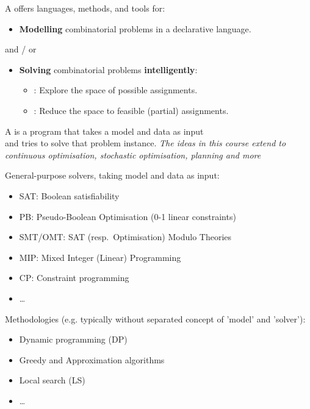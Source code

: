 \documentclass{cons-beamer}
\begin{document}
\begin{frame}
	A  offers languages, methods, and tools for: \vfill
	\begin{itemize}
		\item[what:] \textbf{Modelling} combinatorial problems in a \alert{declarative} language.
	\end{itemize}\vfill
	and / or \vfill
	\begin{itemize}
		\item[how:] \textbf{Solving} combinatorial problems \textbf{intelligently}: \vfill
		\begin{itemize}
			\item {}: Explore the space of possible assignments. \vfill
			\item {}: Reduce the space to feasible (partial) assignments. \vfill
		\end{itemize}
	\end{itemize}
	A  is a program that takes a model and data as input \\
	and tries to solve that problem instance.\vfill
	\textit{The ideas in this course extend to continuous optimisation, stochastic optimisation, planning and more}
\end{frame}

\begin{frame}
	\begin{examples}
		General-purpose solvers, taking model and data as input:
		\begin{itemize}
			\item SAT: Boolean satisfiability
			\item PB: Pseudo-Boolean Optimisation (0-1 linear constraints)
			\item SMT/OMT: SAT (resp.\ Optimisation) Modulo Theories
			\item MIP: Mixed Integer (Linear) Programming
			\item CP: Constraint programming
			\item \dots
		\end{itemize}
	\end{examples}
	\begin{examples}
		Methodologies (e.g. typically without separated concept of 'model' and 'solver'):
		\begin{itemize}
			\item Dynamic programming (DP)
			\item Greedy and Approximation algorithms
			\item Local search (LS)
			\item \dots
		\end{itemize}
	\end{examples}
\end{frame}
\end{document}
